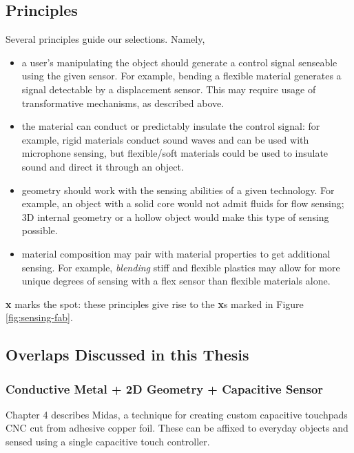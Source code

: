 \subsection{Principles}
    
    Several principles guide our selections. Namely,
    \begin{itemize}
        \item a user's manipulating the object should generate a control signal senseable using the given sensor. For example, bending a flexible material generates a signal detectable by a displacement sensor. This may require usage of transformative mechanisms, as described above.
    
        \item the material can conduct or predictably insulate the control signal: for example, rigid materials conduct sound waves and can be used with microphone sensing, but flexible/soft materials could be used to insulate sound and direct it through an object.
    
        \item geometry should work with the sensing abilities of a given technology. For example, an object with a solid core would not admit fluids for flow sensing; 3D internal geometry or a hollow object would make this type of sensing possible.
      
        \item material composition may pair with material properties to get additional sensing. For example, \emph{blending} stiff and flexible plastics may allow for more unique degrees of sensing with a flex sensor than flexible materials alone. 
    \end{itemize}
    
    \textbf{x} marks the spot: these principles give rise to the \textbf{x}s marked in Figure \ref{fig:sensing-fab}.
    
\subsection{Overlaps Discussed in this Thesis}

    \subsubsection{Conductive Metal + 2D Geometry + Capacitive Sensor}
    
    Chapter 4 describes Midas, a technique for creating custom capacitive touchpads CNC cut from adhesive copper foil. These can be affixed to everyday objects and sensed using a single capacitive touch controller.
    
